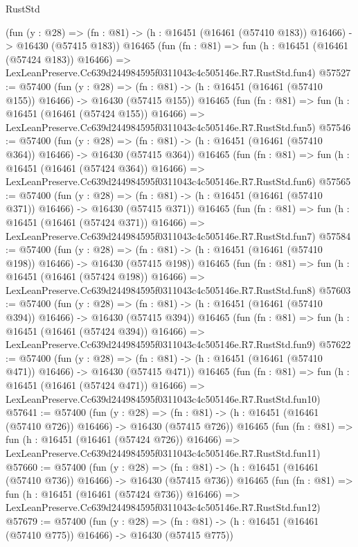 \begin{lexlean}{RustStd}
\begin{coremodule}
    (fun (y : @28) =>
    (fn : @81) -> (h : @16451 (@16461 (@57410 @183)) @16466) -> @16430 (@57415 @183))
    @16465
    (fun (fn : @81) =>
    fun (h : @16451 (@16461 (@57424 @183)) @16466) =>
    LexLeanPreserve.Cc639d244984595f0311043c4c505146e.R7.RustStd.fun4)
@57527 := @57400
    (fun (y : @28) =>
    (fn : @81) -> (h : @16451 (@16461 (@57410 @155)) @16466) -> @16430 (@57415 @155))
    @16465
    (fun (fn : @81) =>
    fun (h : @16451 (@16461 (@57424 @155)) @16466) =>
    LexLeanPreserve.Cc639d244984595f0311043c4c505146e.R7.RustStd.fun5)
@57546 := @57400
    (fun (y : @28) =>
    (fn : @81) -> (h : @16451 (@16461 (@57410 @364)) @16466) -> @16430 (@57415 @364))
    @16465
    (fun (fn : @81) =>
    fun (h : @16451 (@16461 (@57424 @364)) @16466) =>
    LexLeanPreserve.Cc639d244984595f0311043c4c505146e.R7.RustStd.fun6)
@57565 := @57400
    (fun (y : @28) =>
    (fn : @81) -> (h : @16451 (@16461 (@57410 @371)) @16466) -> @16430 (@57415 @371))
    @16465
    (fun (fn : @81) =>
    fun (h : @16451 (@16461 (@57424 @371)) @16466) =>
    LexLeanPreserve.Cc639d244984595f0311043c4c505146e.R7.RustStd.fun7)
@57584 := @57400
    (fun (y : @28) =>
    (fn : @81) -> (h : @16451 (@16461 (@57410 @198)) @16466) -> @16430 (@57415 @198))
    @16465
    (fun (fn : @81) =>
    fun (h : @16451 (@16461 (@57424 @198)) @16466) =>
    LexLeanPreserve.Cc639d244984595f0311043c4c505146e.R7.RustStd.fun8)
@57603 := @57400
    (fun (y : @28) =>
    (fn : @81) -> (h : @16451 (@16461 (@57410 @394)) @16466) -> @16430 (@57415 @394))
    @16465
    (fun (fn : @81) =>
    fun (h : @16451 (@16461 (@57424 @394)) @16466) =>
    LexLeanPreserve.Cc639d244984595f0311043c4c505146e.R7.RustStd.fun9)
@57622 := @57400
    (fun (y : @28) =>
    (fn : @81) -> (h : @16451 (@16461 (@57410 @471)) @16466) -> @16430 (@57415 @471))
    @16465
    (fun (fn : @81) =>
    fun (h : @16451 (@16461 (@57424 @471)) @16466) =>
    LexLeanPreserve.Cc639d244984595f0311043c4c505146e.R7.RustStd.fun10)
@57641 := @57400
    (fun (y : @28) =>
    (fn : @81) -> (h : @16451 (@16461 (@57410 @726)) @16466) -> @16430 (@57415 @726))
    @16465
    (fun (fn : @81) =>
    fun (h : @16451 (@16461 (@57424 @726)) @16466) =>
    LexLeanPreserve.Cc639d244984595f0311043c4c505146e.R7.RustStd.fun11)
@57660 := @57400
    (fun (y : @28) =>
    (fn : @81) -> (h : @16451 (@16461 (@57410 @736)) @16466) -> @16430 (@57415 @736))
    @16465
    (fun (fn : @81) =>
    fun (h : @16451 (@16461 (@57424 @736)) @16466) =>
    LexLeanPreserve.Cc639d244984595f0311043c4c505146e.R7.RustStd.fun12)
@57679 := @57400
    (fun (y : @28) =>
    (fn : @81) -> (h : @16451 (@16461 (@57410 @775)) @16466) -> @16430 (@57415 @775))

\end{coremodule}
\end{lexlean}
